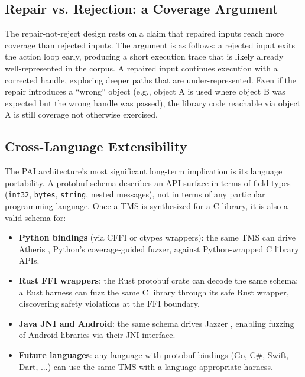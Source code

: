 \documentclass[sigconf,anonymous]{acmart}
\begin{document}
\subsection{Repair vs. Rejection: a Coverage Argument}

The repair-not-reject design rests on a claim that repaired inputs reach
more coverage than rejected inputs.  The argument is as follows: a
rejected input exits the action loop early, producing a short execution
trace that is likely already well-represented in the corpus.  A repaired
input continues execution with a corrected handle, exploring deeper paths
that are under-represented.  Even if the repair introduces a ``wrong''
object (e.g., object A is used where object B was expected but the wrong
handle was passed), the library code reachable via object A is still
coverage not otherwise exercised.

\subsection{Cross-Language Extensibility}
\label{sec:cross_language}

The PAI architecture's most significant long-term implication is its
language portability.  A protobuf schema describes an API surface in
terms of field types (\texttt{int32}, \texttt{bytes}, \texttt{string},
nested messages), not in terms of any particular programming language.
Once a TMS is synthesized for a C library, it is also a valid schema
for:

\begin{itemize}
  \item \textbf{Python bindings} (via CFFI or ctypes wrappers): the same
    TMS can drive Atheris \cite{atheris}, Python's coverage-guided
    fuzzer, against Python-wrapped C library APIs.
  \item \textbf{Rust FFI wrappers}: the Rust protobuf crate can decode
    the same schema; a Rust harness can fuzz the same C library through
    its safe Rust wrapper, discovering safety violations at the FFI
    boundary.
  \item \textbf{Java JNI and Android}: the same schema drives Jazzer
    \cite{jazzer}, enabling fuzzing of Android libraries via their JNI
    interface.
  \item \textbf{Future languages}: any language with protobuf bindings
    (Go, C\#, Swift, Dart, ...) can use the same TMS with a
    language-appropriate harness.
\end{itemize}
\end{document}
